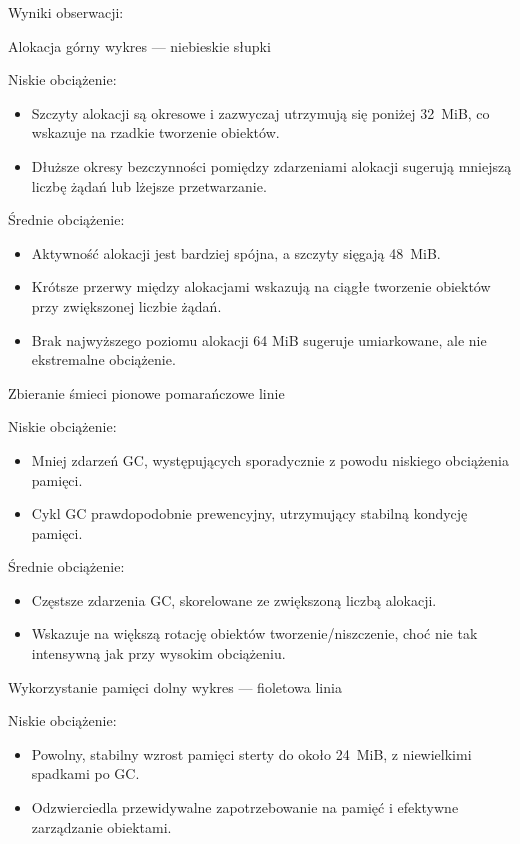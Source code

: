 \documentclass[runningheads,12pt]{llncs}
\begin{document}
Wyniki obserwacji:

Alokacja górny wykres — niebieskie słupki

Niskie obciążenie:

\begin{itemize}
  \item Szczyty alokacji są okresowe i zazwyczaj utrzymują się poniżej 32~MiB, co wskazuje na rzadkie tworzenie obiektów.
  \item Dłuższe okresy bezczynności pomiędzy zdarzeniami alokacji sugerują mniejszą liczbę żądań lub lżejsze przetwarzanie.
\end{itemize}

Średnie obciążenie:

\begin{itemize}
  \item Aktywność alokacji jest bardziej spójna, a szczyty sięgają 48~MiB.
  \item Krótsze przerwy między alokacjami wskazują na ciągłe tworzenie obiektów przy zwiększonej liczbie żądań.
  \item Brak najwyższego poziomu alokacji 64 MiB sugeruje umiarkowane, ale nie ekstremalne obciążenie.
\end{itemize}

Zbieranie śmieci pionowe pomarańczowe linie

Niskie obciążenie:

\begin{itemize}
  \item Mniej zdarzeń GC, występujących sporadycznie z powodu niskiego obciążenia pamięci.
  \item Cykl GC prawdopodobnie prewencyjny, utrzymujący stabilną kondycję pamięci.
\end{itemize}

Średnie obciążenie:

\begin{itemize}
  \item Częstsze zdarzenia GC, skorelowane ze zwiększoną liczbą alokacji.
  \item Wskazuje na większą rotację obiektów tworzenie/niszczenie, choć nie tak intensywną jak przy wysokim obciążeniu.
\end{itemize}

Wykorzystanie pamięci dolny wykres — fioletowa linia

Niskie obciążenie:

\begin{itemize}
  \item Powolny, stabilny wzrost pamięci sterty do około 24~MiB, z niewielkimi spadkami po GC.
  \item Odzwierciedla przewidywalne zapotrzebowanie na pamięć i efektywne zarządzanie obiektami.
\end{itemize}
\end{document}
